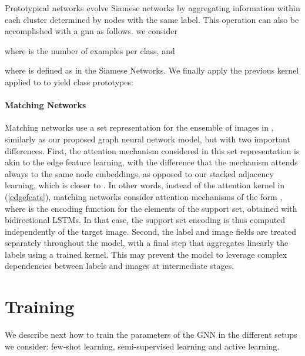 \documentclass{article} \usepackage{iclr2018_conference,times}
\begin{document}
Prototypical networks \cite{snell2017prototypical} evolve Siamese networks
by aggregating information within each cluster determined by nodes with the same
label. This operation can also be accomplished with a gnn as follows. 
we consider 

where  is the number of examples per class, and 

where  is defined as in the Siamese Networks.
We finally apply the previous kernel  
applied to  to yield class prototypes:


\paragraph{Matching Networks}

Matching networks \cite{vinyals2016matching} use a set representation for the ensemble of images in , 
similarly as our proposed graph neural network model, but with two important differences. 
First, the attention mechanism considered in this set representation
is akin to the edge feature learning, with the difference that the mechanism attends always to the same node embeddings, as opposed to our stacked adjacency learning, which is closer to \cite{vaswani2017attention}. In other words, instead of the attention kernel in (\ref{edgefeats}), 
 matching networks consider attention mechanisms of the form , 
 where  is the encoding function for the elements of the support set, obtained with bidirectional LSTMs. In that case, the support set encoding is thus computed independently of the target image.
Second, the label and image fields are treated separately throughout the model, with a final step that aggregates linearly the labels using a trained kernel. This may prevent the model to leverage complex dependencies between labels and images at intermediate stages.
















\section{Training}
\label{trainingsec}

We describe next how to train the parameters of the GNN in the 
different setups we consider: few-shot learning, semi-supervised learning 
and active learning. 
\end{document}
